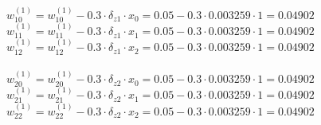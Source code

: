 \documentclass[letterpaper,notitlepage,twoside, fleqn]{article}
\begin{document}
   $w^{(1)}_{10} = w^{(1)}_{10} - 0.3 \cdot \delta_{z1} \cdot x_0 = 0.05 - 0.3 \cdot 0.003259 \cdot 1 = 0.04902$ \\
   $w^{(1)}_{11} = w^{(1)}_{11} - 0.3 \cdot \delta_{z1} \cdot x_1 = 0.05 - 0.3 \cdot 0.003259 \cdot 1 = 0.04902$ \\
   $w^{(1)}_{12} = w^{(1)}_{12} - 0.3 \cdot \delta_{z1} \cdot x_2 = 0.05 - 0.3 \cdot 0.003259 \cdot 1 = 0.04902$ \\\\
   $w^{(1)}_{20} = w^{(1)}_{20} - 0.3 \cdot \delta_{z2} \cdot x_0 = 0.05 - 0.3 \cdot 0.003259 \cdot 1 = 0.04902$ \\
   $w^{(1)}_{21} = w^{(1)}_{21} - 0.3 \cdot \delta_{z2} \cdot x_1 = 0.05 - 0.3 \cdot 0.003259 \cdot 1 = 0.04902$ \\
   $w^{(1)}_{22} = w^{(1)}_{22} - 0.3 \cdot \delta_{z2} \cdot x_2 = 0.05 - 0.3 \cdot 0.003259 \cdot 1 = 0.04902$ \\

   
\end{document}
